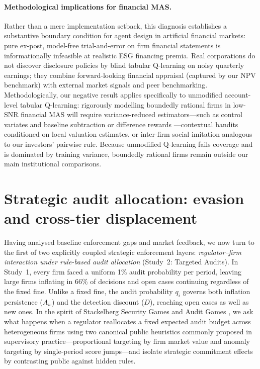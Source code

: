 \documentclass[11pt]{article}
\begin{document}
\paragraph{Methodological implications for financial MAS.}
Rather than a mere implementation setback, this diagnosis establishes a substantive boundary condition for agent design in artificial financial markets: pure ex-post, model-free trial-and-error on firm financial statements is informationally infeasible at realistic ESG financing premia. Real corporations do not discover disclosure policies by blind tabular Q-learning on noisy quarterly earnings; they combine forward-looking financial appraisal (captured by our NPV benchmark) with external market signals and peer benchmarking. Methodologically, our negative result applies specifically to unmodified account-level tabular Q-learning: rigorously modelling boundedly rational firms in low-SNR financial MAS will require variance-reduced estimators---such as control variates and baseline subtraction \citep{sutton2018reinforcement} or difference rewards \citep{agogino2008analyzing}---contextual bandits conditioned on local valuation estimates, or inter-firm social imitation analogous to our investors' pairwise \citet{schlag1998imitate} rule. Because unmodified Q-learning fails coverage and is dominated by training variance, boundedly rational firms remain outside our main institutional comparisons.

\section{Strategic audit allocation: evasion and cross-tier displacement}\label{sec:targeted}

Having analysed baseline enforcement gaps and market feedback, we now turn to the first of two explicitly coupled strategic enforcement layers: \emph{regulator--firm interaction under rule-based audit allocation} (Study~2: Targeted Audits). In Study~1, every firm faced a uniform 1\% audit probability per period, leaving large firms inflating in 66\% of decisions and open cases continuing regardless of the fixed fine. Unlike a fixed fine, the audit probability $q_i$ governs both inflation persistence ($A_w$) and the detection discount ($D$), reaching open cases as well as new ones. In the spirit of Stackelberg Security Games and Audit Games \citep{conitzer2006computing,kiekintveld2009computing,tambe2011security,blocki2015audit,sinha2018stackelberg}, we ask what happens when a regulator reallocates a fixed expected audit budget across heterogeneous firms using two canonical public heuristics commonly proposed in supervisory practice---proportional targeting by firm market value and anomaly targeting by single-period score jumps---and isolate strategic commitment effects by contrasting public against hidden rules.
\end{document}
